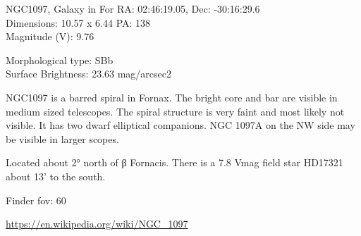 \begin{block}{NGC1097, Galaxy in For}
    RA: 02:46:19.05, Dec: -30:16:29.6 \\ 
    Dimensions: 10.57 x 6.44 PA: 138 \\ 
    Magnitude (V): 9.76

    Morphological type: SBb \\ 
    Surface Brightness: 23.63 mag/arcsec2 

    NGC1097 is a barred spiral in Fornax. The bright core and bar are visible
    in medium sized telescopes. The spiral structure is very faint and most
    likely not visible.  It has two dwarf elliptical companions. NGC 1097A on
    the NW side may be visible in larger scopes.

    Located about 2° north of β Fornacis. There is a 7.8 Vmag field star
    HD17321 about 13' to the south.


    Finder fov: 60 

    \url{https://en.wikipedia.org/wiki/NGC_1097} 
\end{block}
